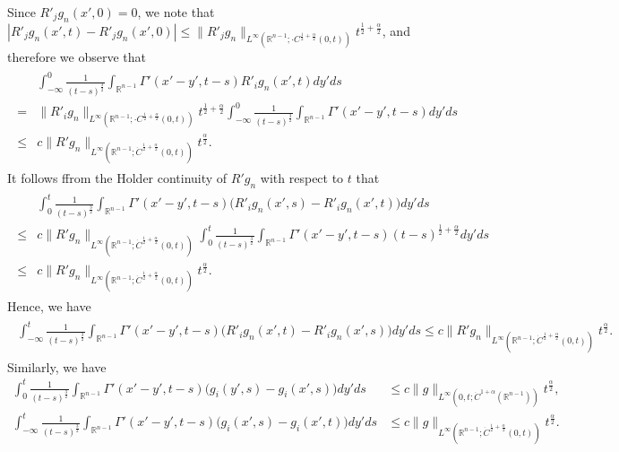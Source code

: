 \documentclass{amsart}
\numberwithin{equation}{section}
\newcommand {\al}{\alpha}
\newcommand{\Rn}{{\mathbb R}^{n-1}}
\newcommand{\Ga}{\Gamma}
\begin{document}
  Since  $ R'_j  g_n (x',0)   =0$, we note that $|R'_j  g_n (x',t)  - R'_j  g_n (x',0)  | \leq \| R'_j  g_n\|_{L^\infty(\Rn; \cdot C^{\frac12 +\frac{\al}2}(0, t))} t^{\frac12 +\frac{\al}2}$, and therefore we observe that 
   \begin{align*}
  \begin{split}
& \int_{-\infty}^0 \frac1{(t -s)^\frac32}    \int_{\Rn}   \Ga' (x' -y', t-s)      R'_i  g_n(x',t)    dy' ds\\
=& \| R'_i g_n \|_{L^\infty(\Rn;\cdot C^{\frac12 +\frac{\al}2} (0, t))}  t^{\frac12 +\frac{\al}2} \int_{-\infty}^0 \frac1{(t -s)^\frac32}    \int_{\Rn}   \Ga' (x' -y', t-s)          dy' ds\\
\leq  & c    \| R' g_n\|_{L^\infty(\Rn; \dot C^{\frac12 +\frac{\al}2}(0,t))} t^{\frac{\al}2}.
  \end{split}
 \end{align*}
It follows ffrom the Holder continuity of $R' g_n$ with respect to $t$ that 
  \begin{align*}
  \begin{split}
 & \int_0^t  \frac1{(t -s)^\frac32}    \int_{\Rn}   \Ga' (x' -y', t-s) \big( R'_i g_n(x',s)   -  R'_i  g_n(x',t)    \big)  dy' ds\\
 \leq & c  \| R' g_n\|_{L^\infty(\Rn; \dot C^{\frac12 +\frac{\al}2}(0,t))}   \int_0^t  \frac1{(t -s)^\frac32}    \int_{\Rn}   \Ga' (x' -y', t-s)  (t -s)^{\frac12 +\frac{\al}2}  dy' ds\\
 \leq & c    \| R' g_n\|_{L^\infty(\Rn; \dot C^{\frac12 +\frac{\al}2}(0,t))} t^{\frac{\al}2}.
  \end{split}
 \end{align*}
Hence, we have 
   \begin{align*}
  \begin{split}
 \int_{-\infty}^t \frac1{(t -s)^\frac32}    \int_{\Rn}   \Ga' (x' -y', t-s)    \big(   R'_i  g_n(x',t)  - R'_i g_n (x',s) \big)   dy' ds
   \leq  c    \| R' g_n\|_{L^\infty(\Rn; \dot C^{\frac12 +\frac{\al}2}(0,t))} t^{\frac{\al}2}.
  \end{split}
 \end{align*}
Similarly, we have 
 \begin{align*}
 \int_0^t  \frac1{(t -s)^\frac32}    \int_{\Rn}   \Ga' (x' -y', t-s) \big(  g_i(y',s)   -   g_i(x',s)    \big)  dy' ds 
  & \leq  c   \| g\|_{L^\infty(0, t;  \dot C^{1 +\al}(\Rn))} t^{\frac{\al}2},\\
   \int_{-\infty}^t  \frac1{(t -s)^\frac32}    \int_{\Rn}   \Ga' (x' -y', t-s) \big(  g_i(x',s)   -   g_i(x',t)    \big)  dy' ds 
  & \leq  c  \| g\|_{L^\infty(\Rn; \dot C^{\frac12 +\frac{\al}2}(0,t))} t^{\frac{\al}2}.
 \end{align*}
\end{document}
